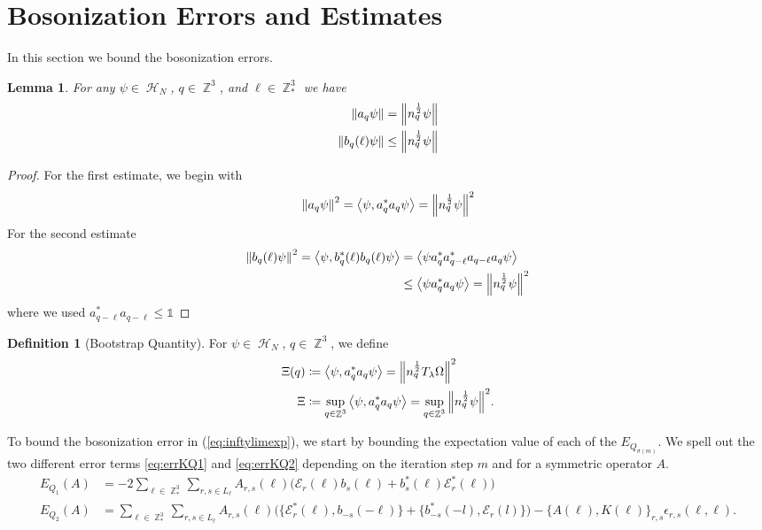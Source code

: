 \documentclass[sn-mathphys, Numbered ,a4paper]{sn-jnl}%
\DeclareMathOperator{\Z}{\mathbb{Z}}
\DeclareMathOperator{\HH}{\mathcal{H}}
\newcommand{\half}{\frac{1}{2}}
\newcommand{\eva}[1]{\left\langle #1 \right\rangle}
\theoremstyle{plain}
\newtheorem{lemma}[theorem]{Lemma}
\theoremstyle{definition}
\newtheorem{definition}[theorem]{Definition}
\theoremstyle{remark}
\theoremstyle{plain}
\theoremstyle{definition}
\theoremstyle{remark}
\begin{document}
\section{Bosonization Errors and Estimates}
In this section we bound the bosonization errors.
\begin{lemma}
	For any $\psi \in \HH_N$, $q \in \Z^3$, and $\ell \in \Z^3_*$ we have 
	\begin{align}
		\norm{a_q\psi}&= \norm{n_q^\half\psi} \\
		\norm{b_q(\ell)\psi}&\leq \norm{n_q^\half\psi}
	\end{align}
\end{lemma}
\begin{proof}
	For the first estimate, we begin with
	\begin{equation}
		\norm{a_q\psi}^2=\eva{\psi,a^*_q a_q\psi}=\norm{n_q^\half\psi}^2
	\end{equation}
For the second estimate
	\begin{align}
		\norm{b_q(\ell)\psi}^2=\eva{\psi,b^*_q(\ell) b_q(\ell)\psi} &=\eva{\psi a^*_q a^*_{q-\ell} a_{q-\ell} a_q\psi}\nonumber\\
		&\leq \eva{\psi a^*_q a_q\psi} = \norm{n_q^\half\psi}^2
	\end{align}
where we used $a^*_{q-\ell}a_{q-\ell}\leq \mathds{1}$ 
\end{proof}
\begin{definition}[Bootstrap Quantity]
 For  $\psi \in \HH_N$, $q\in \Z^3$, we define 
    \begin{align}
        \Xi(q) &\coloneq \expval{\psi, a^*_qa_q\psi} = \norm{n_q^\half T_{\lambda}\Omega}^2\\
        \Xi &\coloneq \sup\limits_{q \in \Z^3}\expval{\psi, a^*_qa_q\psi} = \sup\limits_{q \in \Z^3}\norm{n_q^\half \psi}^2.
    \end{align}
\end{definition}

To bound the bosonization error in (\ref{eq:inftylimexp}), we start by bounding the expectation value of each of the $E_{Q_{\sigma(m)}}$. We spell out the two different error terms \eqref{eq:errKQ1} and \eqref{eq:errKQ2} depending on the iteration step $m$ and for a symmetric operator $A$.
\begin{align}
     E_{Q_1}(A)&=- 2 \sum\limits_{\ell \in \Z^3_*}\sum\limits_{r,s \in L_{\ell}}A_{r,s}(\ell)\Big(\mathcal{E}_{r}(\ell)b_{s}(\ell) + b^*_{s}(\ell)\mathcal{E}^*_{r}(\ell)\Big)\nonumber\\ 
    E_{Q_2}(A) &=
        \sum\limits_{\ell \in \Z^3_*}\sum\limits_{r,s \in L_{\ell}}A_{r,s}(\ell)\Big(\big\{\mathcal{E}^*_{r}(\ell), b_{-s}(-\ell)\big\} + \big\{ b^*_{-s}(-l),\mathcal{E}_r(l)\big\}\Big) - \big\{A(\ell),K(\ell)\big\}_{r,s}\epsilon_{r,s}(\ell,\ell) .\nonumber 
\end{align}
\end{document}
